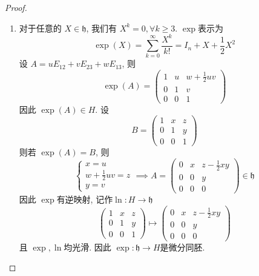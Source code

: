 \documentclass[../main.tex]{subfiles}
\begin{document}
\begin{proof}
\begin{enumerate}
\[\begin{pmatrix}
        1&0&b\\ 
         0&1&0\\ 
          0&0&1 
    \end{pmatrix}: b\in \mathbb{R}   \right\} 
    \] \[
    \mathfrak{z}\left( \mathfrak{h} \right)= \left\{ X \in \mathfrak{h}: [X,Y]= 0,\forall Y \in \mathfrak{h} \right\} 
    \]设 \[
    X= uE_{12}+ vE_{23}+ wE_{13}, \quad Y= xE_{12}+ yE_{23}+ zE_{13}
    \], 则 \[
    [X,Y]= uyE_{13}-vxE_{13}= \left( uy-vx \right)E_{13} 
    \]因此 \[
    X \in \mathfrak{z}\left( \mathfrak{h} \right)\iff uy= vx,\forall Y\in  \mathfrak{z}\left( \mathfrak{h} \right)\iff u= v= 0  
    \]因此 \[
    \mathfrak{z}\left( \mathfrak{h} \right)= \operatorname{span}\left\{ E_{13} \right\} 
    \]

    \item  对于任意的 \(  X \in \mathfrak{h}  \), 我们有 \(  X^{k}= 0,\forall k\ge 3  \).   \(  \exp   \)表示为 \[
    \exp \left( X \right)= \sum _{k= 0}^{\infty}\frac{X^{k} }{k! }= I_{n}+  X+ \frac{1 }{2 }X^{2}   
    \]  设 \(  A= uE_{12}+ vE_{23}+ wE_{13}  \), 则 \[
    \exp \left( A \right)= \begin{pmatrix} 
        1& u&w+ \frac{1}{2}uv\\ 
         0&1& v\\ 
          0&0&1
    \end{pmatrix}  
    \]  因此 \(  \exp \left( A \right)\in  H   \).  设  \[
    B= \begin{pmatrix} 
        1&x&z\\ 
         0&1&y\\ 
          0&0&1 
    \end{pmatrix} 
    \]则若 \(  \exp \left( A \right)= B   \), 则 \[
    \begin{cases} x= u\\ 
     w+ \frac{1}{2}uv= z\\ 
      y= v \end{cases} \implies A= \begin{pmatrix} 
          0&x&z-\frac{1}{2}xy\\ 
           0&0&y\\ 
            0&0&0 
      \end{pmatrix} \in \mathfrak{h}
    \] 因此 \(  \exp   \)有逆映射, 记作\(\ln :  H\to \mathfrak{h}  \)   \[
    \begin{pmatrix} 
        1&x&z\\ 
         0&1&y\\ 
          0&0&1 
    \end{pmatrix}\mapsto   \begin{pmatrix} 
          0&x&z-\frac{1}{2}xy\\ 
           0&0&y\\ 
            0&0&0 
      \end{pmatrix} 
    \] 且 \(  \exp ,\ln   \)均光滑.  因此 \(  \exp :\mathfrak{h}\to H  \)是微分同胚. 
  \end{enumerate}
  
\end{proof}
\end{document}
